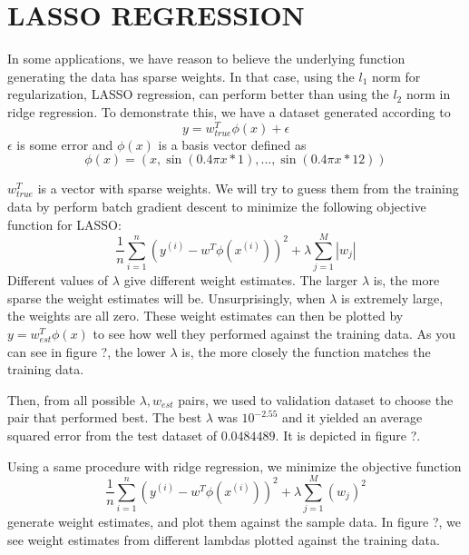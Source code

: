 \documentclass[a4paper,twoside]{article}
\begin{document}
\section{\uppercase{LASSO Regression}}
In some applications, we have reason to believe the underlying function generating the data has sparse weights. In that case, using the $l_1$ norm for regularization, LASSO regression, can perform better than using the $l_2$ norm in ridge regression. To demonstrate this, we have a dataset generated according to 
\begin{equation}
y = w_{true}^T \phi (x) + \epsilon
\end{equation}
$\epsilon$ is some error and $\phi (x)$ is a basis vector defined as 
\begin{equation}
\phi(x) = (x, \sin(0.4 \pi x * 1), ..., \sin(0.4 \pi x * 12))
\end{equation}

$w_{true}^T$ is a vector with sparse weights. We will try to guess them from the training data by perform batch gradient descent to minimize the following objective function for LASSO:
\begin{equation}
\frac{1}{n} \sum_{i=1}^{n} (y^{(i)} - w^T \phi(x^{(i)}))^2 + \lambda \sum_{j=1}^{M} |w_j|
\end{equation}
Different values of $\lambda$ give different weight estimates. The larger $\lambda$ is, the more sparse the weight estimates will be. Unsurprisingly, when $\lambda$ is extremely large, the weights are all zero. These weight estimates can then be plotted by $y = w_{est}^T \phi (x)$ to see how well they performed against the training data. As you can see in figure ?, the lower $\lambda$ is, the more closely the function matches the training data.


Then, from all possible $\lambda, w_{est}$ pairs, we used to validation dataset to choose the pair that performed best. The best $\lambda$ was $10^{-2.55}$ and it yielded an average squared error from the test dataset of $0.0484489$. It is depicted in figure ?.


Using a same procedure with ridge regression, we minimize the objective function
\begin{equation}
\frac{1}{n} \sum_{i=1}^{n} (y^{(i)} - w^T \phi(x^{(i)}))^2 + \lambda \sum_{j=1}^{M} (w_j)^2
\end{equation}
generate weight estimates, and plot them against the sample data. In figure ?, we see weight estimates from different lambdas plotted against the training data.
\end{document}
